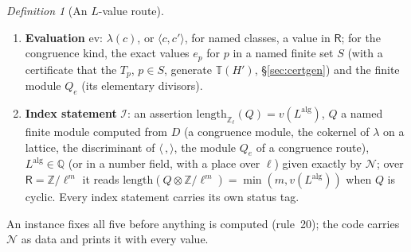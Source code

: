 \documentclass[11pt]{article}
\theoremstyle{remark}
\newtheorem{definition}[theorem]{Definition}
\newcommand{\Z}{\mathbb{Z}}
\newcommand{\Q}{\mathbb{Q}}
\newcommand{\T}{\mathbb{T}}
\begin{document}
\begin{definition}[An $L$-value route]
\begin{enumerate}
  $\varepsilon\in\{+,-\}$ (the $\iota$-eigenvalue); the Euler factors removed, each as an exact rational at $s_0$; the period convention (none; $\Omega_f^{\pm}$; the
  Petersson norm); every normalising constant (Gauss sums, powers of $2\pi i$, factorials) as an exact rational or an algebraic number with its $\ell$-valuation;
  and the \emph{ambiguity} allowed --- an index statement is an equality of ideals of $\Z_\ell$ (of $\ell$-valuations), never of $\ell$-adic units unless the
  record says so.
\item \textbf{Evaluation} $\mathrm{ev}$: $\lambda(c)$, or $\langle c,c'\rangle$, for named classes, a value in $\mathsf R$; for the \textsf{congruence} kind, the exact values
  $e_p$ for $p$ in a named finite set $S$ (with a certificate that the $T_p$, $p\in S$, generate $\T(H')$, \S\ref{sec:certgen}) and the finite module $Q_e$ (its
  elementary divisors).
\item \textbf{Index statement} $\mathcal I$: an assertion $\mathrm{length}_{\Z_\ell}(Q)=v(L^{\mathrm{alg}})$, $Q$ a named finite module computed from $D$ (a congruence
  module, the cokernel of $\lambda$ on a lattice, the discriminant of $\langle\,,\rangle$, the module $Q_e$ of a \textsf{congruence} route), $L^{\mathrm{alg}}\in\Q$ (or in a number field, with a place over $\ell$)
  given exactly by $\mathcal N$; over $\mathsf R=\Z/\ell^{m}$ it reads $\mathrm{length}(Q\otimes\Z/\ell^{m})=\min(m,v(L^{\mathrm{alg}}))$ when $Q$ is cyclic. Every
  index statement carries its own status tag.
\end{enumerate}
An instance fixes all five before anything is computed (rule~20); the code carries $\mathcal N$ as data and prints it with every value.
\end{definition}
\end{document}
